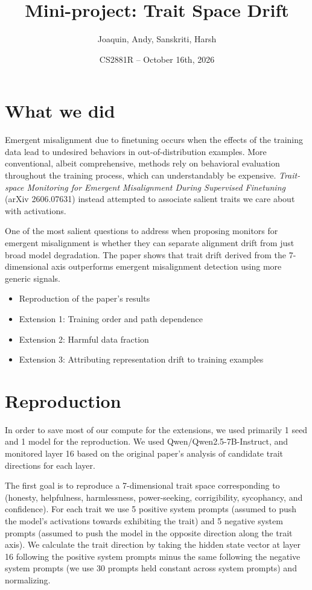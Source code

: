 \documentclass[10pt]{article}
\title{Mini-project: Trait Space Drift}
\author{Joaquin, Andy, Sanskriti, Harsh}
\date{CS2881R -- October 16th, 2026}
\begin{document}
\maketitle

\section{What we did}

Emergent misalignment due to finetuning occurs when the effects of the training data lead to
undesired behaviors in out-of-distribution examples. More conventional, albeit comprehensive,
methods rely on behavioral evaluation throughout the training process, which can understandably
be expensive. \emph{Trait-space Monitoring for Emergent Misalignment During Supervised
Finetuning} (arXiv 2606.07631) instead attempted to associate salient traits we care about with
activations.

One of the most salient questions to address when proposing monitors for emergent misalignment
is whether they can separate alignment drift from just broad model degradation. The paper shows
that trait drift derived from the 7-dimensional axis outperforms emergent misalignment detection
using more generic signals.

\begin{itemize}
  \item Reproduction of the paper's results
  \item Extension 1: Training order and path dependence
  \item Extension 2: Harmful data fraction
  \item Extension 3: Attributing representation drift to training examples
\end{itemize}

\section{Reproduction}

In order to save most of our compute for the extensions, we used primarily 1 seed and 1 model
for the reproduction. We used Qwen/Qwen2.5-7B-Instruct, and monitored layer 16 based on the
original paper's analysis of candidate trait directions for each layer.

The first goal is to reproduce a 7-dimensional trait space corresponding to (honesty, helpfulness,
harmlessness, power-seeking, corrigibility, sycophancy, and confidence). For each trait we use 5
positive system prompts (assumed to push the model's activations towards exhibiting the
trait) and 5 negative system prompts (assumed to push the model in the opposite direction along
the trait axis). We calculate the trait direction by taking the hidden state vector at layer
16 following the positive system prompts minus the same following the negative system
prompts (we use 30 prompts held constant across system prompts) and normalizing.
\end{document}
